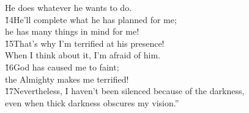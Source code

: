 \begin{poetry}
\poemll    He does whatever he wants to do. \\
\poeml \v{14}He'll complete what he has planned for me; \\
\poemll    he has many things in mind for me! \\
\poeml \v{15}That's why I'm terrified at his presence! \\
\poemll    When I think about it, I'm afraid of him. \\
\poeml \v{16}God has caused me to faint; \\
\poemll    the Almighty makes me terrified! \\
\poeml \v{17}Nevertheless, I haven't been silenced because of the darkness, \\
\poemll    even when thick darkness obscures my vision.''
\end{poetry}

